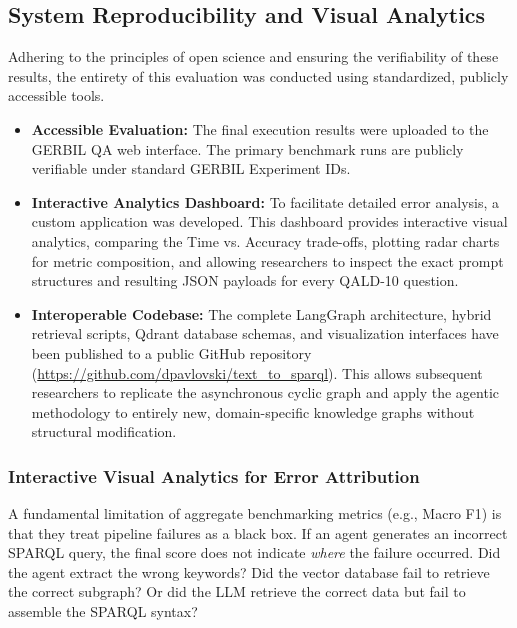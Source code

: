 \subsection{System Reproducibility and Visual Analytics}
\label{sec:reproducibility}

Adhering to the principles of open science and ensuring the verifiability of these results, the entirety of this evaluation was conducted using standardized, publicly accessible tools. 

\begin{itemize}
    \item \textbf{Accessible Evaluation:} The final execution results were uploaded to the GERBIL QA web interface. The primary benchmark runs are publicly verifiable under standard GERBIL Experiment IDs.
    \item \textbf{Interactive Analytics Dashboard:} To facilitate detailed error analysis, a custom application was developed. This dashboard provides interactive visual analytics, comparing the Time vs. Accuracy trade-offs, plotting radar charts for metric composition, and allowing researchers to inspect the exact prompt structures and resulting JSON payloads for every QALD-10 question.
    \item \textbf{Interoperable Codebase:} The complete LangGraph architecture, hybrid retrieval scripts, Qdrant database schemas, and visualization interfaces have been published to a public GitHub repository (\url{https://github.com/dpavlovski/text_to_sparql}). This allows subsequent researchers to replicate the asynchronous cyclic graph and apply the agentic methodology to entirely new, domain-specific knowledge graphs without structural modification.
\end{itemize}

\subsubsection{Interactive Visual Analytics for Error Attribution}
\label{sec:visual_analytics}

A fundamental limitation of aggregate benchmarking metrics (e.g., Macro F1) is that they treat pipeline failures as a black box. If an agent generates an incorrect SPARQL query, the final score does not indicate \textit{where} the failure occurred. Did the agent extract the wrong keywords? Did the vector database fail to retrieve the correct subgraph? Or did the LLM retrieve the correct data but fail to assemble the SPARQL syntax?

